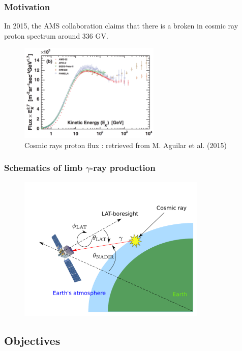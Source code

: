\documentclass{beamer}
\begin{document}
\begin{frame}
\frametitle{Motivation}
In 2015, the AMS collaboration claims that there is a broken in cosmic ray proton spectrum around 336 GV.
\begin{figure}
  \includegraphics[width=0.6\textwidth]{proton_spectrum}
  \caption{Cosmic rays proton flux : retrieved from M. Aguilar et al. (2015)}
\end{figure}
\end{frame}

\begin{frame}
\frametitle{Schematics of limb $\gamma$-ray production}
\centering
\begin{figure}[h!]
\includegraphics[width = 0.8\textwidth]{lat_production_schematic}
\end{figure}
\end{frame}

\subsection{Objectives}
\end{document}
